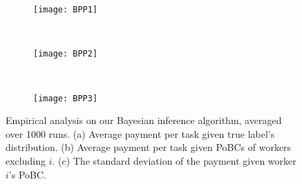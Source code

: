 \documentclass{article}
\begin{document}
\begin{figure}[t!]
    \centering
    \begin{subfigure}[t]{0.315\textwidth}
        \centering
        \texttt{[image: BPP1]}
        \caption{\label{BIM2}}
    \end{subfigure}%
    ~
    \begin{subfigure}[t]{0.325\textwidth}
        \centering
       \texttt{[image: BPP2]}
        \caption{\label{BIM3}}
    \end{subfigure}
        ~
    \begin{subfigure}[t]{0.325\textwidth}
        \centering
        \texttt{[image: BPP3]}
        \caption{\label{BIM4}}
    \end{subfigure}
    \caption{\label{BIM} Empirical analysis on our Bayesian inference algorithm, averaged over 1000 runs. (a) Average payment per task given true label's distribution. (b) Average payment per task given PoBCs of workers excluding $i$. (c) The standard deviation of the payment given worker $i$'s PoBC.}
    \vspace{-5mm}
\end{figure}






\end{document}
